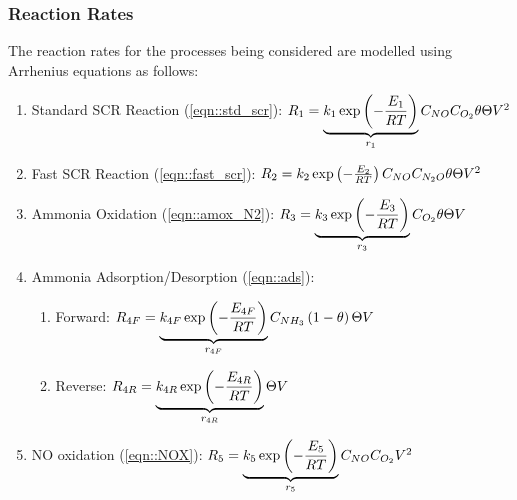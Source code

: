 \subsubsection{Reaction Rates}
The reaction rates for the processes being considered are modelled using
Arrhenius equations as follows:
\begin{enumerate}
\item Standard SCR Reaction (\ref{eqn::std_scr}):
$ R_1 = \underbrace{k_1 \exp\left( -\frac{E_1}{RT} \right)}_{r_1} C_{NO} C_{O_2} \theta \Theta V^2 $

\item Fast SCR Reaction (\ref{eqn::fast_scr}):
$ R_2 = k_2 \exp\left( -\frac{E_2}{RT} \right) C_{NO} C_{N_2O} \theta \Theta V^2 $

\item Ammonia Oxidation (\ref{eqn::amox_N2}):
$ R_3 = \underbrace{k_3 \exp\left( -\frac{E_3}{RT} \right)}_{r_3} C_{O_2} \theta \Theta
V $

\item Ammonia Adsorption/Desorption (\ref{eqn::ads}):
\begin{enumerate}
    \item Forward: $ R_{4F} = \underbrace{k_{4F} \exp \left( -\frac{E_{4F}}{RT} \right)}_{r_{4F}} C_{NH_3} \left( 1-\theta \right) \Theta V$

    \item Reverse: $ R_{4R} = \underbrace{k_{4R} \exp \left( -\frac{E_{4R}}{RT} \right)}_{r_{4R}}
\Theta V $
\end{enumerate}

\item NO oxidation (\ref{eqn::NOX}):
$ R_5 = \underbrace{k_5 \exp \left( - \frac{E_5}{RT} \right)}_{r_5} C_{NO} C_{O_2} V^2 $
\end{enumerate}

